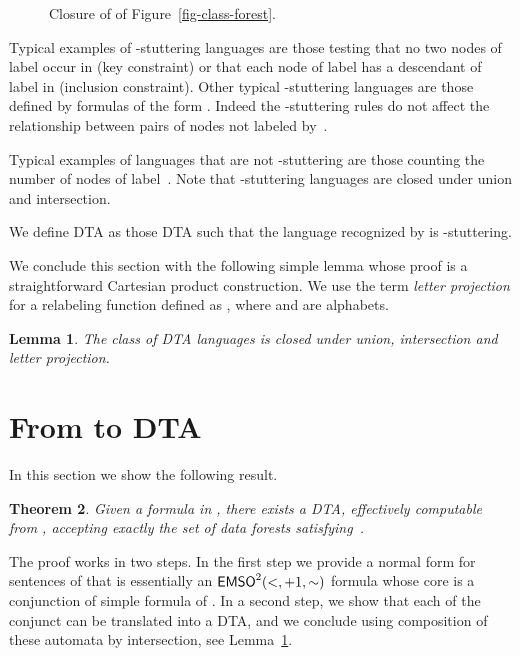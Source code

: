 \documentclass{CSML}
\newtheorem{theorem}{Theorem}
\newtheorem{lemma}[theorem]{Lemma}
\newcommand\neighbor{\ensuremath{\mathord{+}1}}
\newcommand\descendant{\ensuremath{\mathord{<}}}
\newcommand\emsotwo{\ensuremath{\emso^2(\descendant,\neighbor,\mathord{\sim})}\xspace}
\newcommand\dad{\textup{DTA}\xspace}
\newcommand\wdad{\textup{DTA}\xspace}
\begin{document}
\begin{figure}

\caption{Closure of  of Figure~\ref{fig-class-forest}.}
\label{fig-class-closure}
\end{figure}


\medskip Typical examples of -stuttering languages are those testing that
no two nodes of label  occur in  (key constraint) or that each
node of label  has a descendant of label  in  (inclusion
constraint).  Other typical -stuttering languages are those defined by
formulas of the form . Indeed the  -stuttering rules do not affect the
relationship between pairs of nodes not labeled by~.

Typical examples of languages that are not -stuttering are
those counting the number of nodes of label~.  
Note that -stuttering
languages are closed under union and intersection. 




\medskip


We define \dad as those \wdad  such that the language recognized by  is -stuttering.
\medskip

We conclude this section with the following simple lemma whose proof is a
straightforward Cartesian product construction. We use the term \emph{letter
  projection} for a relabeling function defined as , where 
and  are alphabets.


\begin{lemma} \label{lem:conjunction-disjunction}
The class of \dad languages is closed 
under union, intersection and letter projection.
\end{lemma}

\section{From \texorpdfstring{\fotwo}{FO2} to \texorpdfstring{\dad}{DTA}}
\label{sec-fotwo-dad}

In this section we show the following result.
\begin{theorem}\label{th-fotwodad}
Given a formula  in \fotwo, there exists a \dad,
effectively computable from ,
accepting exactly the set of data forests satisfying~.
\end{theorem}

The proof works in two steps. 
In the first step we provide a normal form for sentences of \fotwo 
that is essentially an \emsotwo formula 
whose core is a conjunction of simple formula of \fotwo. 
In a second step, 
we show that each of the conjunct can be translated into a \dad, 
and we conclude using
composition of these automata by intersection, 
see Lemma~\ref{lem:conjunction-disjunction}.
\end{document}
